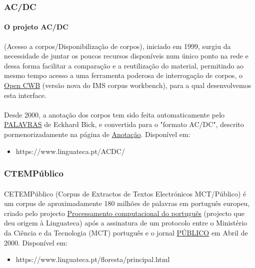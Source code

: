 \documentclass[a4paper, 10pt]{article}
\begin{document}
            \subsubsection{AC/DC}
            	\paragraph{O projeto AC/DC }(Acesso a corpos/Disponibilização de corpos), iniciado em 1999, surgiu da necessidade de juntar os poucos recursos disponíveis num único ponto na rede e dessa forma facilitar a comparação e a reutilização do material, permitindo ao mesmo tempo acesso a uma ferramenta poderosa de interrogação de corpos, o \href{http://cwb.sourceforge.net/}{Open CWB} (versão nova do IMS corpus workbench), para a qual desenvolvemos esta interface.
				\paragraph{}Desde 2000, a anotação dos corpos tem sido feita automaticamente pelo \href{http://visl.sdu.dk/visl/pt/}{PALAVRAS} de Eckhard Bick, e convertida para o "formato AC/DC", descrito pormenorizadamente na página de \href{https://www.linguateca.pt/acesso/anotacao.html}{Anotação}.
				Disponível em:
				\begin{itemize}
				    \item https://www.linguateca.pt/ACDC/

			    \end{itemize}

            \subsubsection{CTEMPúblico}
            	\paragraph{} CETEMPúblico (Corpus de Extractos de Textos Electrónicos MCT/Público) é um corpus de aproximadamente 180 milhões de palavras em português europeu, criado pelo projecto \href{https://www.linguateca.pt/proc_comp_port.html}{Processamento computacional do português} (projecto que deu origem à Linguateca) após a assinatura de um protocolo entre o Ministério da Ciência e da Tecnologia (MCT) português e o jornal \href{https://www.publico.pt/}{PÚBLICO} em Abril de 2000.
            	Disponível em:
            	\begin{itemize}
				\item https://www.linguateca.pt/floresta/principal.html

			    \end{itemize}
\end{document}
